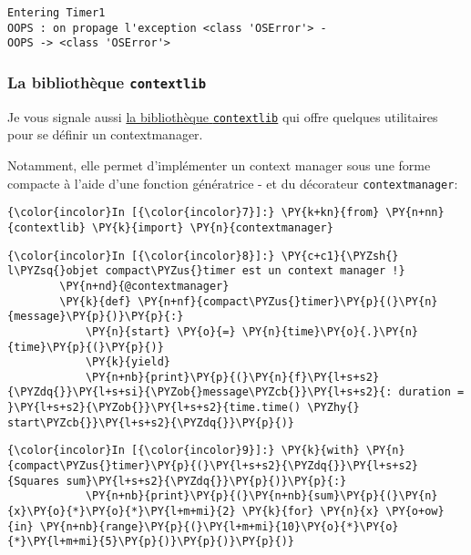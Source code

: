     \begin{Verbatim}[commandchars=\\\{\}]
Entering Timer1
OOPS : on propage l'exception <class 'OSError'> - 
OOPS -> <class 'OSError'>

    \end{Verbatim}

    \hypertarget{la-bibliothuxe8que-contextlib}{%
\subsubsection{\texorpdfstring{La bibliothèque
\texttt{contextlib}}{La bibliothèque contextlib}}\label{la-bibliothuxe8que-contextlib}}

    Je vous signale aussi
\href{https://docs.python.org/3/library/contextlib.html}{la bibliothèque
\texttt{contextlib}} qui offre quelques utilitaires pour se définir un
contextmanager.

Notamment, elle permet d'implémenter un context manager sous une forme
compacte à l'aide d'une fonction génératrice - et du décorateur
\texttt{contextmanager}:

    \begin{Verbatim}[commandchars=\\\{\}]
{\color{incolor}In [{\color{incolor}7}]:} \PY{k+kn}{from} \PY{n+nn}{contextlib} \PY{k}{import} \PY{n}{contextmanager}
\end{Verbatim}


    \begin{Verbatim}[commandchars=\\\{\}]
{\color{incolor}In [{\color{incolor}8}]:} \PY{c+c1}{\PYZsh{} l\PYZsq{}objet compact\PYZus{}timer est un context manager !}
        \PY{n+nd}{@contextmanager}
        \PY{k}{def} \PY{n+nf}{compact\PYZus{}timer}\PY{p}{(}\PY{n}{message}\PY{p}{)}\PY{p}{:}
            \PY{n}{start} \PY{o}{=} \PY{n}{time}\PY{o}{.}\PY{n}{time}\PY{p}{(}\PY{p}{)}
            \PY{k}{yield}
            \PY{n+nb}{print}\PY{p}{(}\PY{n}{f}\PY{l+s+s2}{\PYZdq{}}\PY{l+s+si}{\PYZob{}message\PYZcb{}}\PY{l+s+s2}{: duration = }\PY{l+s+s2}{\PYZob{}}\PY{l+s+s2}{time.time() \PYZhy{} start\PYZcb{}}\PY{l+s+s2}{\PYZdq{}}\PY{p}{)}
\end{Verbatim}


    \begin{Verbatim}[commandchars=\\\{\}]
{\color{incolor}In [{\color{incolor}9}]:} \PY{k}{with} \PY{n}{compact\PYZus{}timer}\PY{p}{(}\PY{l+s+s2}{\PYZdq{}}\PY{l+s+s2}{Squares sum}\PY{l+s+s2}{\PYZdq{}}\PY{p}{)}\PY{p}{:}
            \PY{n+nb}{print}\PY{p}{(}\PY{n+nb}{sum}\PY{p}{(}\PY{n}{x}\PY{o}{*}\PY{o}{*}\PY{l+m+mi}{2} \PY{k}{for} \PY{n}{x} \PY{o+ow}{in} \PY{n+nb}{range}\PY{p}{(}\PY{l+m+mi}{10}\PY{o}{*}\PY{o}{*}\PY{l+m+mi}{5}\PY{p}{)}\PY{p}{)}\PY{p}{)}
\end{Verbatim}


